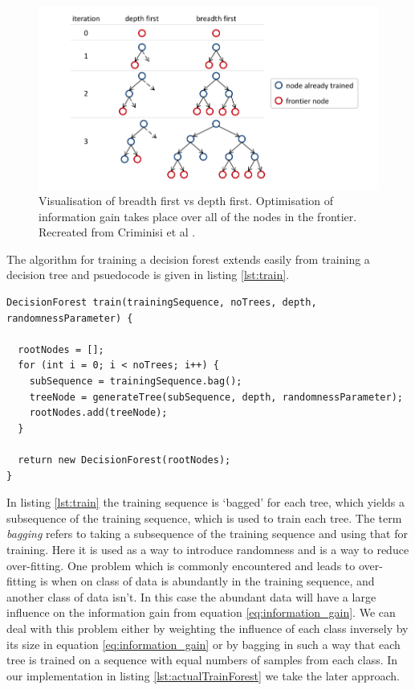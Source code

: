 \documentclass[12pt,twoside,notitlepage]{report}
\begin{document}
          \begin{figure}
              \centering
              \includegraphics[scale=0.3]{breadthfirst_vs_depthfirst}
              \caption{Visualisation of breadth first vs depth first. Optimisation of information gain takes place over 
              all of the nodes in the frontier. Recreated from Criminisi et al \cite{criminisi2013decision}.}
              \label{fig:breadth_first}
          \end{figure}

          The algorithm for training a decision forest extends easily from training a decision tree and psuedocode is 
          given in listing \ref{lst:train}.

          \begin{lstlisting}[float=tp,caption={Psuedocode to train a decision forest.}, label={lst:classify}]
DecisionForest train(trainingSequence, noTrees, depth, randomnessParameter) {

  rootNodes = [];
  for (int i = 0; i < noTrees; i++) {
    subSequence = trainingSequence.bag();
    treeNode = generateTree(subSequence, depth, randomnessParameter);
    rootNodes.add(treeNode);
  }

  return new DecisionForest(rootNodes);
}
          \end{lstlisting}

          In listing \ref{lst:train} the training sequence is `bagged' for each tree, which yields a subsequence of the 
          training sequence, which is used to train each tree. The term \textit{bagging} refers to taking a subsequence 
          of the training sequence and using that for training. Here it is used as a way to introduce randomness and 
          is a way to reduce over-fitting. One problem which is commonly encountered and leads to over-fitting is when 
          on class of data is abundantly in the training sequence, and another class of data isn't. In this case the 
          abundant data will have a large influence on the information gain from equation \ref{eq:information_gain}. We 
          can deal with this problem either by weighting the influence of each class inversely by its size in equation 
          \ref{eq:information_gain} or by bagging in such a way that each tree is trained on a sequence with equal 
          numbers of samples from each class. In our implementation in listing \ref{lst:actualTrainForest} we take the 
          later approach. 
\end{document}
